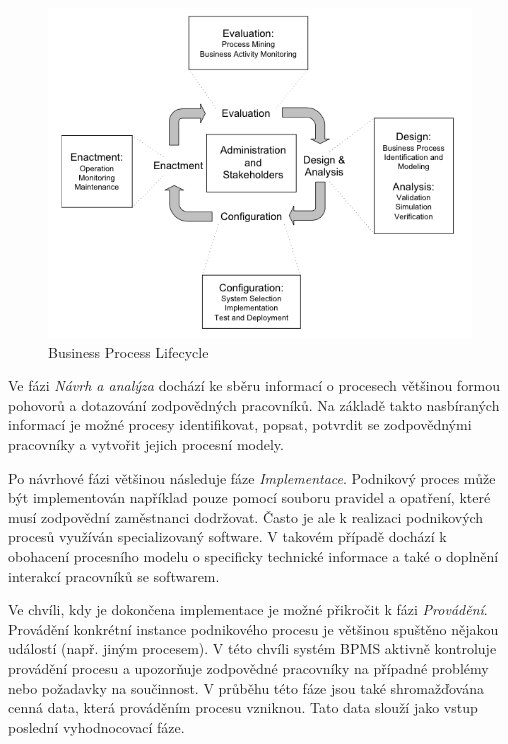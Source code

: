 \begin{figure}[H]\centering %
\includegraphics[width=1.0\textwidth]{obrazky/processLifecycle}
\caption{Business Process Lifecycle \cite{Weske2007}}
\label{fig:BusinessProcessLifecycle}
\end{figure}

Ve fázi \textit{Návrh a analýza} dochází ke sběru informací o procesech většinou formou pohovorů a dotazování zodpovědných pracovníků. Na základě takto nasbíraných informací je možné procesy identifikovat, popsat, potvrdit se zodpovědnými pracovníky a vytvořit jejich procesní modely.

Po návrhové fázi většinou následuje fáze \textit{Implementace}. Podnikový proces může být implementován například pouze  pomocí souboru pravidel a opatření, které musí zodpovědní zaměstnanci dodržovat. Často je ale k realizaci podnikových procesů využíván specializovaný software. V takovém případě dochází k obohacení procesního modelu o specificky technické informace a také o doplnění interakcí pracovníků se softwarem.

Ve chvíli, kdy je dokončena implementace je možné přikročit k fázi \textit{Provádění}. Provádění konkrétní instance podnikového procesu je většinou spuštěno nějakou událostí (např. jiným procesem). V této chvíli systém BPMS aktivně kontroluje provádění procesu a upozorňuje zodpovědné pracovníky na případné problémy nebo požadavky na součinnost. V průběhu této fáze jsou také shromažďována cenná data, která prováděním procesu vzniknou. Tato data slouží jako vstup poslední vyhodnocovací fáze.

